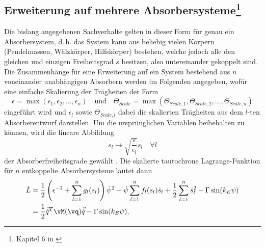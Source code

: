 \subsection[Erweiterung auf mehrere Absorbersysteme]
				{Erweiterung auf mehrere Absorbersysteme\footnote{Kapitel 6 in \cite{Mayet:Tautochronic}}} 
				
				\label{subsec:TautDesignMehrerAbsorber}
%
%
%
%
%
Die bislang angegebenen Sachverhalte gelten in dieser Form für genau ein Absorbersystem, d.\,h. das System kann 
aus beliebig vielen Körpern (Pendelmassen, Wälzkörper, Hilfskörper) bestehen, welche jedoch alle den 
gleichen und einzigen Freiheitsgrad $s$ besitzen, also untereinander gekoppelt sind. 
Die Zusammenhänge für eine Erweiterung auf ein System bestehend aus $n$ voneinander unabhängigen Absorbern werden 
im Folgenden angegeben, wofür eine einfache Skalierung der Trägheiten der Form
%
%
\begin{equation}
	\epsilon = \max(\epsilon_1, \epsilon_2, \dots, \epsilon_n) \quad \text{und} \quad \Theta_{Scale} = \max(\Theta_{Scale,1},\Theta_{Scale,2}, \dots, \Theta_{Scale,n})
\label{eq:SkalierungderTraegheitenFuerMehrereAbsorber}
\end{equation}
eingeführt wird und $\epsilon_l$ sowie $\Theta_{Scale,l}$ dabei die skalierten Trägheiten aus dem $l$-ten Absorberentwurf darstellen. 
Um die ursprünglichen Variablen beibehalten zu können, wird die lineare Abbildung
%
% 
\begin{equation}
	 s_l \mapsto \sqrt{\frac{\epsilon}{\epsilon_l}} s_l \quad \forall  l
\label{eq:MappingFuerMehrereAbsorber}
\end{equation}
der Absorberfreiheitsgrade gewählt \cite{Mayet:Tautochronic}. 
Die skalierte tautochrone Lagrange-Funktion für $n$ entkoppelte Absorbersysteme lautet dann 
%
%
%
\begin{equation}
	\begin{split}
	\tilde{L} &= \frac{1}{2} \left(\epsilon^{-1} + \sum_{l=1}^n g_l(s_l) \right)\dot{\psi}^2 + \dot{\psi} \sum_{l=1}^n f_l(s_l) \dot{s}_l + \frac{1}{2} \sum_{l=1}^n \dot{s}^2_l - \Gamma \sin(k_E \psi)\\   					&= \frac{1}{2} \vec{\dot{q}}^T \vM(\vq) \vec{\dot{q}} - \Gamma \sin(k_E \psi), 
	\end{split}
	\label{eq:SkalierteLagrangeFunktionfuerMehrereAbsorbersystem}
\end{equation}
